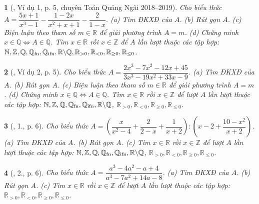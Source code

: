 \documentclass{article}
\newtheorem{baitoan}{}
\begin{document}
\begin{baitoan}[\cite{Lam_An_Tuan_Toan_9_dai_so}, Ví dụ 1, p. 5, chuyên Toán Quảng Ngãi 2018--2019]
	Cho biểu thức $A = \dfrac{5x + 1}{x^3 - 1} - \dfrac{1 - 2x}{x^2 + x + 1} - \dfrac{2}{1 - x}$. (a) Tìm {\rm ĐKXĐ} của $A$. (b) Rút gọn $A$. (c) Biện luận theo tham số $m\in\mathbb{R}$ để giải phương trình $A = m$. (d) Chứng minh $x\in\mathbb{Q}\Leftrightarrow A\in\mathbb{Q}$. Tìm $x\in\mathbb{R}$ rồi $x\in\mathbb{Z}$ để $A$ lần lượt thuộc các tập hợp:  $\mathbb{N},\mathbb{Z},\mathbb{Q},\mathbb{Q}_{\rm fn},\mathbb{Q}_{\rm ifn},\mathbb{R}\backslash\mathbb{Q},\mathbb{R}_{> 0},\mathbb{R}_{< 0},\mathbb{R}_{\ge0},\mathbb{R}_{\le0}$.
\end{baitoan}

\begin{baitoan}[\cite{Lam_An_Tuan_Toan_9_dai_so}, Ví dụ 2, p. 5]
	Cho biểu thức $A = \dfrac{2x^3 - 7x^2 - 12x + 45}{3x^3 -19x^2 + 33x - 9}$. (a) Tìm {\rm ĐKXĐ} của $A$. (b) Rút gọn $A$. (c) Biện luận theo tham số $m\in\mathbb{R}$ để giải phương trình $A = m$. (d) Chứng minh $x\in\mathbb{Q}\Leftrightarrow A\in\mathbb{Q}$. Tìm $x\in\mathbb{R}$ rồi $x\in\mathbb{Z}$ để lượt $A$ lần lượt thuộc các tập hợp:  $\mathbb{N},\mathbb{Z},\mathbb{Q},\mathbb{Q}_{\rm fn},\mathbb{Q}_{\rm ifn},\mathbb{R}\backslash\mathbb{Q}$, $\mathbb{R}_{> 0},\mathbb{R}_{< 0},\mathbb{R}_{\ge0},\mathbb{R}_{\le0}$.
\end{baitoan}

\begin{baitoan}[\cite{Lam_An_Tuan_Toan_9_dai_so}, 1., p. 6]
	Cho biểu thức $A = \left(\dfrac{x}{x^2 - 4} + \dfrac{2}{2 - x} + \dfrac{1}{x + 2}\right):\left(x - 2 + \dfrac{10 - x^2}{x + 2}\right)$. (a) Tìm {\rm ĐKXĐ} của $A$. (b) Rút gọn $A$. (c) Tìm $x\in\mathbb{R}$ rồi $x\in\mathbb{Z}$ để lượt $A$ lần lượt thuộc các tập hợp:  $\mathbb{N},\mathbb{Z},\mathbb{Q},\mathbb{Q}_{\rm fn},\mathbb{Q}_{\rm ifn},\mathbb{R}\backslash\mathbb{Q}$, $\mathbb{R}_{> 0},\mathbb{R}_{< 0},\mathbb{R}_{\ge0},\mathbb{R}_{\le0}$.
\end{baitoan}

\begin{baitoan}[\cite{Lam_An_Tuan_Toan_9_dai_so}, 2., p. 6]
	Cho biểu thức $A = \dfrac{a^3 - 4a^2 - a + 4}{a^3 - 7a^2 + 14a - 8}$. (a) Tìm {\rm ĐKXĐ} của $A$. (b) Rút gọn $A$. (c) Tìm $x\in\mathbb{R}$ rồi $x\in\mathbb{Z}$ để lượt $A$ lần lượt thuộc các tập hợp:  $\mathbb{R}_{> 0},\mathbb{R}_{< 0},\mathbb{R}_{\ge0},\mathbb{R}_{\le0}$.
\end{baitoan}
\end{document}
